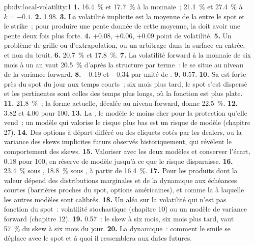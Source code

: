 \begin{solution}{pb:dv:local-volatility:1}
\textbf{1.} 16.4~\% et 17.7~\% à la monnaie~; 21.1~\% et 27.4~\% à $k=-0.1$.
\textbf{2.} 1.98.
\textbf{3.} La volatilité implicite est la moyenne de la  entre le spot et le strike~; pour produire une
pente donnée de cette moyenne, la  doit avoir une pente deux fois plus forte.
\textbf{4.} $+0.08$, $+0.06$, $+0.09$ point de volatilité.
\textbf{5.} Un problème de grille ou d'extrapolation, ou un arbitrage dans la surface en entrée, et non du bruit.
\textbf{6.} 20.7~\% et 17.8~\%.
\textbf{7.} La volatilité forward à la monnaie de six mois à un an vaut 20.5~\% d'après la structure par terme~: le
 se situe au niveau de la variance forward.
\textbf{8.} $-0.19$ et $-0.34$ par unité de .
\textbf{9.} 0.57.
\textbf{10.} Sa  est forte près du spot du jour aux temps courts~; six mois plus tard, le spot s'est dispersé et
les  pertinentes sont celles des temps plus longs, où la fonction est plus plate.
\textbf{11.} 21.8~\%~; la forme actuelle, décalée au niveau forward, donne 22.5~\%.
\textbf{12.} 3.82 et 4.00 pour 100.
\textbf{13.} La , le modèle le moins cher pour la protection qu'elle vend~; un modèle qui valorise le risque plus bas
est un risque de modèle (chapitre 27).
\textbf{14.} Des options à départ différé ou des cliquets cotés par les dealers, ou la variance des skews implicites futurs observés
historiquement, qui révèlent le comportement des skews.
\textbf{15.} Valoriser avec les deux modèles et conserver l'écart, 0.18 pour 100, en réserve de modèle jusqu'à ce que le risque disparaisse.
\textbf{16.} 23.4~\% sous , 18.8~\% sous , à partir de 16.4~\%.
\textbf{17.} Pour les produits dont la valeur dépend des distributions marginales et de la dynamique aux échéances courtes (barrières proches
du spot, options américaines), et comme la  à laquelle les autres modèles sont calibrés.
\textbf{18.} Un aléa sur la volatilité qui n'est pas fonction du spot~: volatilité stochastique (chapitre 10) ou un
modèle de variance forward (chapitre 12).
\textbf{19.} 0.57~: le skew à six mois, six mois plus tard, vaut 57~\% du skew à six mois du jour.
\textbf{20.} La dynamique~: comment le smile se déplace avec le spot et à quoi il ressemblera aux dates futures.
\end{solution}

